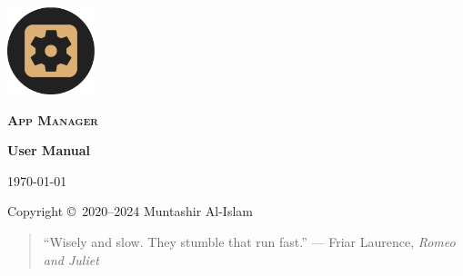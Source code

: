 \begin{titlingpage}
    \pagecolor{SunTan}
    \begin{center}
        \includegraphics[width=1in]{../images/icon}\par\vspace{1cm}
        {\Huge\textbf{\textsc{App Manager}}\par}
        \vspace{2.5cm}
        {\huge\bfseries User Manual\par}
        \vspace{.5cm}
        {\Large\itshape\version\par}
        \vfill
        {\large\today\par}
        \vfill
        {Copyright \copyright\ 2020--2024 Muntashir Al-Islam\par}
        \pagebreak
        \pagecolor{white}
        \begin{quotation}
            ``Wisely and slow. They stumble that run fast.''
                {--- Friar Laurence, \textit{Romeo and Juliet}}
        \end{quotation}
    \end{center}
\end{titlingpage}
